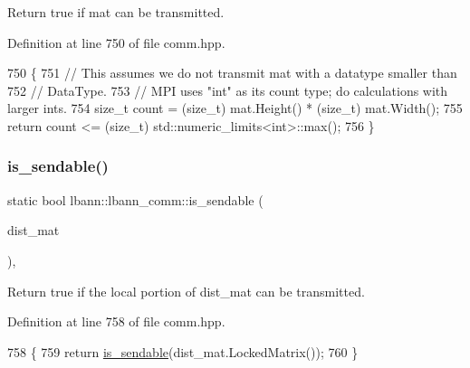 Return true if mat can be transmitted. 

Definition at line 750 of file comm.\+hpp.


\begin{DoxyCode}
750                                                  \{
751     \textcolor{comment}{// This assumes we do not transmit mat with a datatype smaller than}
752     \textcolor{comment}{// DataType.}
753     \textcolor{comment}{// MPI uses "int" as its count type; do calculations with larger ints.}
754     \textcolor{keywordtype}{size\_t} count = (size\_t) mat.Height() * (size\_t) mat.Width();
755     \textcolor{keywordflow}{return} count <= (size\_t) std::numeric\_limits<int>::max();
756   \}
\end{DoxyCode}
\mbox{\label{classlbann_1_1lbann__comm_ac6addefb7577f81fbc90da94d26991e4}} 
\subsubsection{\texorpdfstring{is\+\_\+sendable()}{is\_sendable()}\hspace{0.1cm}{\footnotesize\ttfamily [2/2]}}
{\footnotesize\ttfamily static bool lbann\+::lbann\+\_\+comm\+::is\+\_\+sendable (\begin{DoxyParamCaption}\item[{const \hyperlink{base_8hpp_a9a697a504ae84010e7439ffec862b470}{Abs\+Dist\+Mat} \&}]{dist\+\_\+mat }\end{DoxyParamCaption})\hspace{0.3cm}{\ttfamily [inline]}, {\ttfamily [static]}}

Return true if the local portion of dist\+\_\+mat can be transmitted. 

Definition at line 758 of file comm.\+hpp.


\begin{DoxyCode}
758                                                              \{
759     \textcolor{keywordflow}{return} \hyperlink{classlbann_1_1lbann__comm_a4ba1b9a6b4eb986a348d85c2d80ca3eb}{is\_sendable}(dist\_mat.LockedMatrix());
760   \}
\end{DoxyCode}
\mbox{\label{classlbann_1_1lbann__comm_a17ef6771432c3e91cd7d404d182ed531}} 
